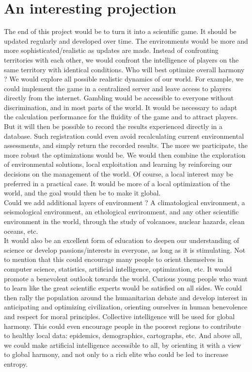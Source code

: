 \chapter*{An interesting projection}

The end of this project would be to turn it into a scientific game. It should be updated regularly and developed over time. The environments would be more and more sophisticated/realistic as updates are made. Instead of confronting territories with each other, we would confront the intelligence of players on the same territory with identical conditions. Who will best optimize overall harmony ? We would explore all possible realistic dynamics of our world. For example, we could implement the game in a centralized server and leave access to players directly from the internet. Gambling would be accessible to everyone without discrimination, and in most parts of the world. It would be necessary to adapt the calculation performance for the fluidity of the game and to attract players. But it will then be possible to record the results experienced directly in a database. Such registration could even avoid recalculating current environmental assessments, and simply return the recorded results. The more we participate, the more robust the optimizations would be. We would then combine the exploration of environmental solutions, local exploitation and learning by reinforcing our decisions on the management of the world. Of course, a local interest may be preferred in a practical case. It would be more of a local optimization of the world, and the goal would then be to make it global.\\

Could we add additional layers of environment ? A climatological environment, a seismological environment, an ethological environment, and any other scientific environment in the world, through the study of volcanoes, nuclear hazards, clean oceans, etc.\\
 
It would also be an excellent form of education to deepen our understanding of science or develop passions/interests in everyone, as long as it is stimulating. Not to mention that this could encourage many people to orient themselves in computer science, statistics, artificial intelligence, optimization, etc. It would promote a benevolent outlook towards the world. Curious young people who want to learn like the great scientific experts would be satisfied on all sides. We could then rally the population around the humanitarian debate and develop interest in anticipating and optimizing civilization, orienting ourselves in human benevolence and respect for moral principles. Collective intelligence will be used for global harmony. This could even encourage people in the poorest regions to contribute to healthy local data: epidemics, demographics, cartographs, etc. And above all, we could make artificial intelligence accessible to all, by orienting it with a view to global harmony, and not only to a rich elite who could be led to increase entropy.\\

